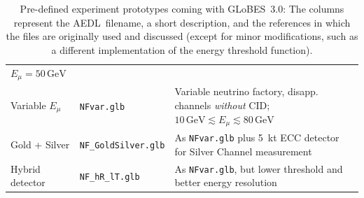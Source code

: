 \documentclass[12pt,a4paper]{article}
\newcommand{\capdef}{}
\newcommand{\mycaption}[2][\capdef]{\renewcommand{\capdef}{#2}%
       \caption[#1]{{\footnotesize #2}}}
\newcommand{\GLOBESN}{{\sf GLoBES~3.0}}
\newcommand{\AEDL}{{\sf AEDL}}
\begin{document}
\begin{table}[t!]
{\begin{center}
\begin{tabular}{llp{7.0cm}c}
$E_\mu = 50 \, \mathrm{GeV}$ & \cite{Huber:2002mx} \\
Variable $E_\mu$ & {\tt NFvar.glb} & Variable neutrino factory, disapp. channels
{\em without} CID; $10 \, \mathrm{GeV} \lesssim E_\mu \lesssim 80 \, \mathrm{GeV}$ & \cite{Huber:2002mx,Huber:2006wb}  \\
Gold + Silver & {\tt NF\_GoldSilver.glb} & As {\tt NFvar.glb} 
plus 5~kt ECC detector for Silver Channel
measurement & \cite{Huber:2002mx,Huber:2006wb,Autiero:2003fu} \\
Hybrid detector & {\tt NF\_hR\_lT.glb} & As {\tt NFvar.glb}, but 
lower threshold and better energy resolution & \cite{Huber:2002mx,Huber:2006wb} \\
\hline
\end{tabular}
\end{center}
} %
\mycaption{\label{tab:experiments} 
Pre-defined experiment prototypes coming with \GLOBESN : The columns represent the \AEDL\ filename, 
a short description, and the references in which the files are originally used and 
discussed (except for minor modifications, such as a different implementation of 
the energy threshold function). 
}
\end{table}
\end{document}
